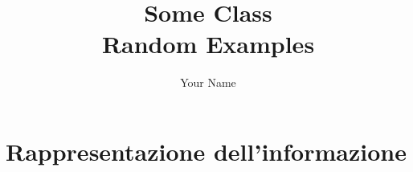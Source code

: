 \documentclass{report}
\title{\Huge{Some Class}\\Random Examples}
\author{\huge{Your Name}}
\date{}
\begin{document}
\maketitle
\newpage%
\tableofcontents
\pagebreak

\chapter{Rappresentazione dell'informazione} %
\label{chap:Rappresentazione dell'informazione}



\end{document}
